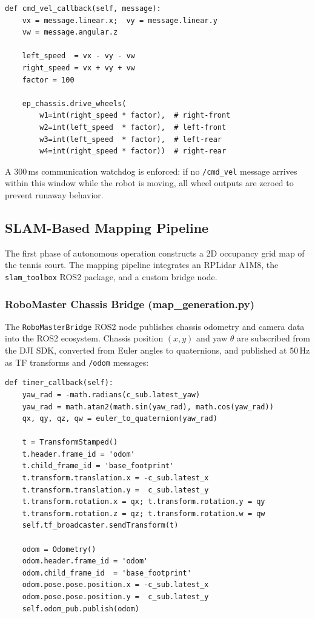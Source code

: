 \begin{verbatim}
def cmd_vel_callback(self, message):
    vx = message.linear.x;  vy = message.linear.y
    vw = message.angular.z

    left_speed  = vx - vy - vw
    right_speed = vx + vy + vw
    factor = 100

    ep_chassis.drive_wheels(
        w1=int(right_speed * factor),  # right-front
        w2=int(left_speed  * factor),  # left-front
        w3=int(left_speed  * factor),  # left-rear
        w4=int(right_speed * factor))  # right-rear
\end{verbatim}

A 300\,ms communication watchdog is enforced: if no \texttt{/cmd\_vel} message arrives within this window while the robot is moving, all wheel outputs are zeroed to prevent runaway behavior.


\subsection{SLAM-Based Mapping Pipeline}
\label{sec:slam}

The first phase of autonomous operation constructs a 2D occupancy grid map of the tennis court. The mapping pipeline integrates an RPLidar A1M8, the \texttt{slam\_toolbox} ROS2 package, and a custom bridge node.

\subsubsection{RoboMaster Chassis Bridge (map\_generation.py)}
\label{sec:map_generation}

The \texttt{RoboMasterBridge} ROS2 node publishes chassis odometry and camera data into the ROS2 ecosystem. Chassis position $(x, y)$ and yaw $\theta$ are subscribed from the DJI SDK, converted from Euler angles to quaternions, and published at 50\,Hz as TF transforms and \texttt{/odom} messages:

\begin{verbatim}
def timer_callback(self):
    yaw_rad = -math.radians(c_sub.latest_yaw)
    yaw_rad = math.atan2(math.sin(yaw_rad), math.cos(yaw_rad))
    qx, qy, qz, qw = euler_to_quaternion(yaw_rad)

    t = TransformStamped()
    t.header.frame_id = 'odom'
    t.child_frame_id = 'base_footprint'
    t.transform.translation.x = -c_sub.latest_x
    t.transform.translation.y =  c_sub.latest_y
    t.transform.rotation.x = qx; t.transform.rotation.y = qy
    t.transform.rotation.z = qz; t.transform.rotation.w = qw
    self.tf_broadcaster.sendTransform(t)

    odom = Odometry()
    odom.header.frame_id = 'odom'
    odom.child_frame_id  = 'base_footprint'
    odom.pose.pose.position.x = -c_sub.latest_x
    odom.pose.pose.position.y =  c_sub.latest_y
    self.odom_pub.publish(odom)
\end{verbatim}

